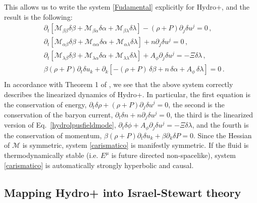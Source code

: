 \documentclass[a4paper, amsfonts, amssymb, amsmath, reprint, showkeys, nofootinbib, twoside, onecolumn,notitlepage]{revtex4-1}
\begin{document}
This allows us to write the system \eqref{Fudamental} explicitly for Hydro+, and the result is the following:
\begin{equation}\label{carismatico}
\begin{split}
& \partial_t [\mathcal{M}_{\beta\beta} \delta \beta +\mathcal{M}_{\beta\alpha} \delta \alpha+\mathcal{M}_{\beta\lambda} \delta \lambda]-(\rho+P) \partial_j \delta u^j = 0 \, , \\
& \partial_t [\mathcal{M}_{\alpha\beta} \delta \beta +\mathcal{M}_{\alpha\alpha} \delta \alpha+\mathcal{M}_{\alpha\lambda} \delta \lambda]+n \partial_j \delta u^j = 0 \, , \\
& \partial_t [\mathcal{M}_{\lambda\beta} \delta \beta +\mathcal{M}_{\lambda\alpha} \delta \alpha+\mathcal{M}_{\lambda\lambda} \delta \lambda]+A_\phi \partial_j \delta u^j = -\Xi \delta \lambda \, , \\
& \beta (\rho+P) \partial_t \delta u_k +\partial_k [-(\rho+P) \,\delta \beta+n \,\delta \alpha+A_\phi \, \delta \lambda]=0 \, . \\
\end{split}
\end{equation}
In accordance with Theorem 1 of \cite{paperI}, we see that the above system correctly describes the linearized dynamics of Hydro+. In particular, the first equation is the conservation of energy, $\partial_t \delta \rho+(\rho+P)\partial_j \delta u^j =0$, the second is the conservation of the baryon current, $\partial_t \delta n +n \partial_j \delta u^j=0$, the third is the linearized version of Eq.\ \eqref{hydrolpusfieldmode}, $\partial_t \delta \phi+A_\phi \partial_j \delta u^j = -\Xi \delta \lambda$, and the fourth is the conservation of momentum, $\beta(\rho+P)\partial_t \delta u_k +\beta\partial_k  \delta P =0$. Since the Hessian of $\mathcal{M}$ is symmetric, system \eqref{carismatico} is manifestly symmetric. If the fluid is thermodynamically stable (i.e. $E^\mu$ is future directed non-spacelike), system \eqref{carismatico} is automatically strongly hyperbolic and causal. 

\subsection{Mapping Hydro+ into Israel-Stewart theory}\label{hydrIS}
\end{document}
